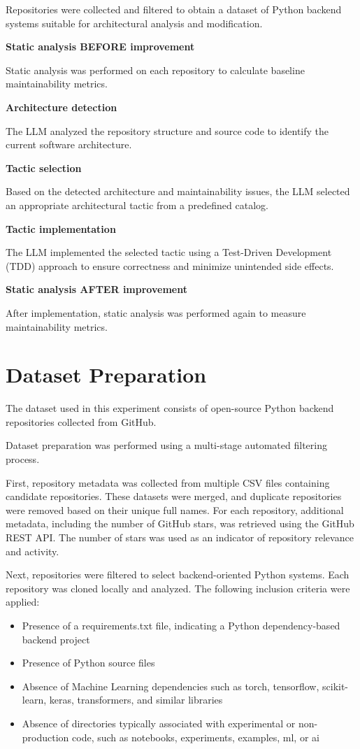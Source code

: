 Repositories were collected and filtered to obtain a dataset of Python backend systems suitable for architectural analysis and modification.

\textbf{Static analysis BEFORE improvement}

Static analysis was performed on each repository to calculate baseline maintainability metrics.

\textbf{Architecture detection}

The LLM analyzed the repository structure and source code to identify the current software architecture.

\textbf{Tactic selection}

Based on the detected architecture and maintainability issues, the LLM selected an appropriate architectural tactic from a predefined catalog.

\textbf{Tactic implementation}

The LLM implemented the selected tactic using a Test-Driven Development (TDD) approach to ensure correctness and minimize unintended side effects.

\textbf{Static analysis AFTER improvement}

After implementation, static analysis was performed again to measure maintainability metrics.

\section{Dataset Preparation}

The dataset used in this experiment consists of open-source Python backend repositories collected from GitHub.

Dataset preparation was performed using a multi-stage automated filtering process.

First, repository metadata was collected from multiple CSV files containing candidate repositories. These datasets were merged, and duplicate repositories were removed based on their unique full names. For each repository, additional metadata, including the number of GitHub stars, was retrieved using the GitHub REST API. The number of stars was used as an indicator of repository relevance and activity.

Next, repositories were filtered to select backend-oriented Python systems. Each repository was cloned locally and analyzed. The following inclusion criteria were applied:

\begin{itemize}
\item Presence of a requirements.txt file, indicating a Python dependency-based backend project
\item Presence of Python source files
\item Absence of Machine Learning dependencies such as torch, tensorflow, scikit-learn, keras, transformers, and similar libraries
\item Absence of directories typically associated with experimental or non-production code, such as notebooks, experiments, examples, ml, or ai
\end{itemize}

